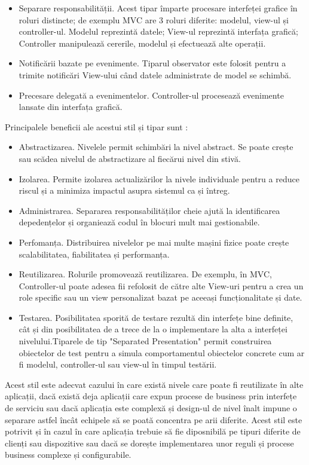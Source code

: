 \documentclass[12pt, a4paper, oneside, romanian]{teza-upb}
\begin{document}
\begin{itemize}
	\item Separare responsabilității. Acest tipar împarte procesare interfeței grafice în roluri distincte; de exemplu MVC are 3 roluri diferite: modelul, view-ul și controller-ul. Modelul reprezintă datele; View-ul reprezintă interfața grafică; Controller manipulează cererile, modelul și efectuează alte operații.
	\item Notificării bazate pe evenimente. Tiparul observator este folosit pentru a trimite notificări View-ului când datele administrate de model se schimbă.
	\item Precesare delegată a evenimentelor. Controller-ul procesează evenimente lansate din interfața grafică.
\end{itemize}

Principalele beneficii ale acestui stil și tipar sunt :
\begin{itemize}
	\item Abstractizarea. Nivelele permit schimbări la nivel abstract. Se poate crește sau scădea nivelul de abstractizare al fiecărui nivel din stivă.
	\item Izolarea. Permite izolarea actualizărilor la nivele individuale pentru a reduce riscul și a minimiza impactul asupra sistemul ca și întreg.
	\item Administrarea. Separarea responsabilităților cheie ajută la identificarea depedențelor și organiează codul în blocuri mult mai gestionabile.
	\item Perfomanța. Distribuirea nivelelor pe mai multe mașini fizice poate crește scalabilitatea, fiabilitatea și performanța. 
	\item Reutilizarea. Rolurile promovează reutilizarea. De exemplu, în MVC, Controller-ul poate adesea fii refolosit de către alte View-uri pentru a crea un role specific sau un view personalizat bazat pe aceeași funcționalitate și date.
	\item Testarea. Posibilitatea sporită de testare rezultă din interfețe bine definite, cât și din posibilitatea de a trece de la o implementare la alta a interfeței nivelului.Tiparele de tip "Separated Presentation" permit construirea obiectelor de test pentru a simula comportamentul obiectelor concrete cum ar fi modelul, controller-ul sau view-ul în timpul testării.
\end{itemize}

Acest stil este adecvat cazului în care există nivele care poate fi reutilizate în alte aplicații, dacă există deja aplicații care expun procese de business prin interfețe de serviciu sau dacă aplicația este complexă și design-ul de nivel înalt impune o separare astfel încât echipele să se poată concentra pe arii diferite. Acest stil este potrivit și în cazul în care aplicația trebuie să fie diposnibilă pe tipuri diferite de clienți sau dispozitive sau dacă se dorește implementarea unor reguli și procese business complexe și configurabile.
\end{document}
